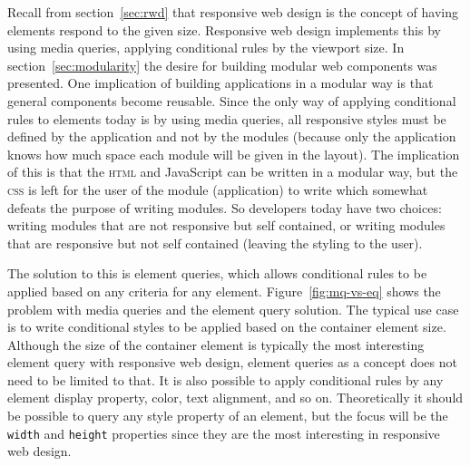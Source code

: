 \documentclass[a4paper,11pt]{kth-mag}
\newcommand{\code}[1]{\texttt{#1}}
\begin{document}
      Recall from section~\ref{sec:rwd} that responsive web design is the concept of having elements respond to the given size.
      Responsive web design implements this by using media queries, applying conditional rules by the viewport size.
      In section~\ref{sec:modularity} the desire for building modular web components was presented.
      One implication of building applications in a modular way is that general components become reusable.
      Since the only way of applying conditional rules to elements today is by using media queries, all responsive styles must be defined by the application and not by the modules (because only the application knows how much space each module will be given in the layout).
      The implication of this is that the \textsc{html} and JavaScript can be written in a modular way, but the \textsc{css} is left for the user of the module (application) to write which somewhat defeats the purpose of writing modules.
      So developers today have two choices: writing modules that are not responsive but self contained, or writing modules that are responsive but not self contained (leaving the styling to the user).

      The solution to this is element queries, which allows conditional rules to be applied based on any criteria for any element.
      Figure~\ref{fig:mq-vs-eq} shows the problem with media queries and the element query solution.
      The typical use case is to write conditional styles to be applied based on the container element size.
      Although the size of the container element is typically the most interesting element query with responsive web design, element queries as a concept does not need to be limited to that.
      It is also possible to apply conditional rules by any element display property, color, text alignment, and so on.
      Theoretically it should be possible to query any style property of an element, but the focus will be the \code{width} and \code{height} properties since they are the most interesting in responsive web design.
\end{document}
